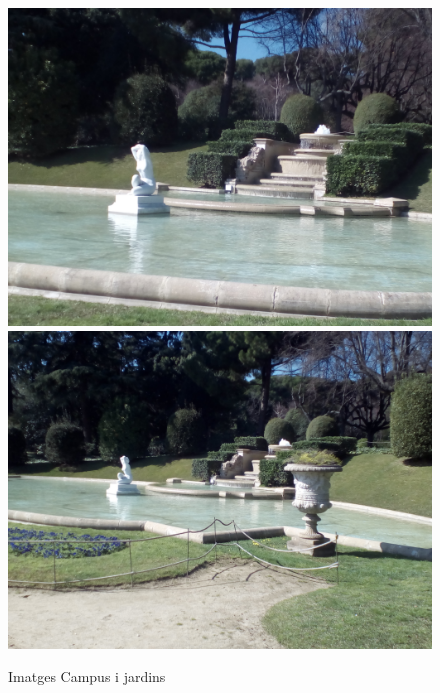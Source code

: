 \begin{figure}[!htb]
				\label{fig:awesome_image2}
			\endminipage\hfill
				\includegraphics[width=\linewidth]{images/experiments/jardi_2}
				\label{fig:awesome_image3}
			\endminipage\hfill
				\includegraphics[width=\linewidth]{images/experiments/jardi2}
				\label{fig:awesome_image3}
			\endminipage
			\caption{Imatges Campus i jardins}
		\end{figure}

